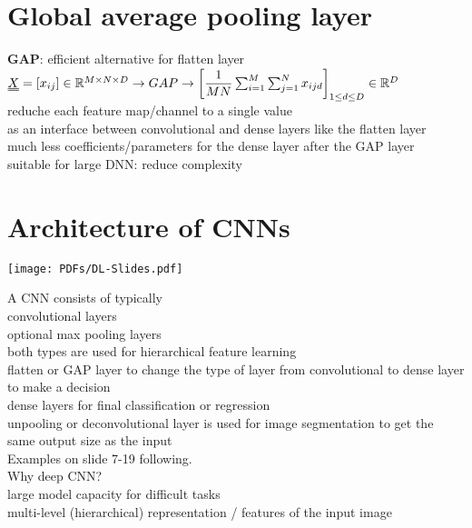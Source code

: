 \section{Global average pooling layer}
\textbf{GAP}: efficient alternative for flatten layer \\
$  \X = [x_{ij}] \in \R^{M \times N \times D} \rightarrow GAP \rightarrow \left[ \dfrac{1}{MN} \sum_{i=1}^{M} \sum_{j=1}^{N} x_{ijd} \right]   _{1 \leq d \le D} \in \R^D$\\
\textbullet reduche each feature map/channel to a single value \\
\textbullet as an interface between convolutional and dense layers like the flatten layer\\
\textbullet much less coefficients/parameters for the dense layer after the GAP layer\\
\textbullet suitable for large DNN: reduce complexity
\section{Architecture of CNNs}
\texttt{[image: PDFs/DL-Slides.pdf]}

A CNN consists of typically \\
\textbullet convolutional layers \\
\textbullet optional max pooling layers \\
both types are used for hierarchical feature learning \\
\textbullet flatten or GAP layer to change the type of layer from convolutional to dense layer to make a decision \\
\textbullet dense layers for final classification or regression \\
\textbullet unpooling or deconvolutional layer is used for image segmentation to get the same output size as the input \\
Examples on slide 7-19 following.\\
Why deep CNN?\\
\textbullet large model capacity for difficult tasks\\
\textbullet multi-level (hierarchical) representation / features of the input image \\
 \\







